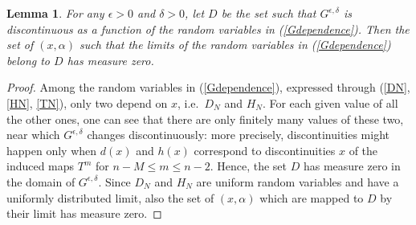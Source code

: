 \documentclass{conm-p-l}
\numberwithin{equation}{section}
\newtheorem{lemma}[theorem]{Lemma}
\begin{document}
\begin{lemma}\label{discontinuities}
For any $\epsilon>0$ and $\delta>0$, let $D$ be the set such that $G^{\epsilon,\delta}$ is discontinuous as a function of the random variables in (\ref{Gdependence}). Then the set of $(x,\alpha)$ such that the limits of the random variables in (\ref{Gdependence}) belong to $D$ has measure zero. 
\end{lemma}
\begin{proof}
Among the random variables in  (\ref{Gdependence}), expressed through (\ref{DN}, \ref{HN}, \ref{TN}), only two depend on $x$, i.e.~$D_N$ and $H_N$. 
 For each given value of all the other ones, one can see that there are only finitely many values of these two, near which $G^{\epsilon,\delta}$ changes discontinuously: more precisely, discontinuities might happen only when $d(x)$ and $h(x)$ correspond to discontinuities $x$ of the induced maps $T^m$ for $n-M\leq m \leq n-2$. Hence, the set $D$ has measure zero in the domain of $G^{\epsilon, \delta}$. Since $D_N$ and $H_N$ 
 are uniform random variables and have a uniformly distributed limit, also the set of $(x,\alpha)$ which are mapped to $D$ by their limit has measure zero.
\end{proof}
\end{document}

